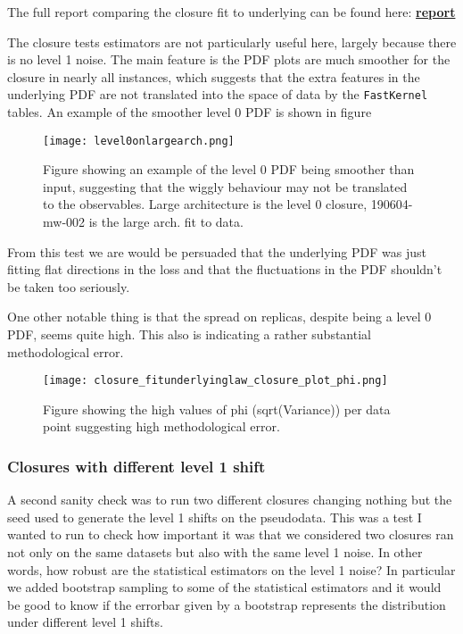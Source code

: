 The full report comparing the closure fit to underlying can be found here:
\href{https://vp.nnpdf.science/tHdjyBVTQEOlfkNjUXPMFQ==}{\bf{report}}

The closure tests estimators are not particularly useful here, largely because
there is no level 1 noise. The main feature is the PDF plots are much smoother
for the closure in nearly all instances, which suggests that the extra features
in the underlying PDF are not translated into the space of data by the
\texttt{FastKernel} tables. An example of the smoother level 0 PDF is shown
in figure

\begin{figure}[!h]
    \centering
    \texttt{[image: level0onlargearch.png]}
    \caption{
        Figure showing an example of the level 0 PDF being smoother than input,
        suggesting that the wiggly behaviour may not be translated to the observables.
        Large architecture is the level 0 closure, 190604-mw-002 is the large arch.
        fit to data.
        }
    \label{fig:dsmoothpdf}
\end{figure}

From this test we are would be persuaded that the underlying PDF was just fitting
flat directions in the loss and that the fluctuations in the PDF shouldn't be
taken too seriously.

One other notable thing is that the spread on replicas, despite being a level 0
PDF, seems quite high. This also is indicating a rather substantial methodological
error.

\begin{figure}[!h]
    \centering
    \texttt{[image: closure\_fitunderlyinglaw\_closure\_plot\_phi.png]}
    \caption{
        Figure showing the high values of phi (sqrt(Variance)) per data point
        suggesting high methodological error.
        }
    \label{fig:lev0methoderr}
\end{figure}

\subsubsection*{Closures with different level 1 shift}

A second sanity check was to run two different closures changing nothing but the
seed used to generate the level 1 shifts on the pseudodata. This was a test I
wanted to run to check how important it was that we considered two closures ran
not only on the same datasets but also with the same level 1 noise. In other
words, how robust are the statistical estimators on the level 1 noise? In particular
we added bootstrap sampling to some of the statistical estimators and it would
be good to know if the errorbar given by a bootstrap represents the distribution
under different level 1 shifts.

